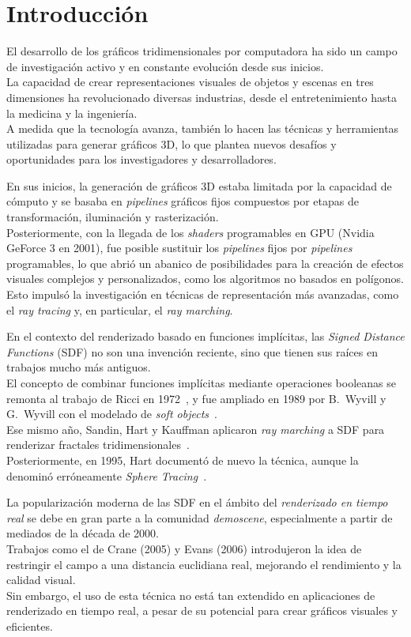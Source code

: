 \chapter{Introducción}
El desarrollo de los gráficos tridimensionales por computadora ha sido un campo de investigación activo y en constante evolución desde sus inicios.\\
La capacidad de crear representaciones visuales de objetos y escenas en tres dimensiones ha revolucionado diversas industrias, desde el entretenimiento hasta la medicina y la ingeniería.\\
A medida que la tecnología avanza, también lo hacen las técnicas y herramientas utilizadas para generar gráficos 3D, lo que plantea nuevos desafíos y oportunidades para los investigadores y desarrolladores.

En sus inicios, la generación de gráficos 3D estaba limitada por la capacidad de cómputo y se basaba en \textit{pipelines} gráficos fijos compuestos por etapas de transformación, iluminación y rasterización.\\
Posteriormente, con la llegada de los \textit{shaders} programables en GPU (Nvidia GeForce 3 en 2001), fue posible sustituir los \textit{pipelines} fijos por \textit{pipelines} programables, lo que abrió un abanico de posibilidades para la creación de efectos visuales complejos y personalizados, como los algoritmos no basados en polígonos.\\
Esto impulsó la investigación en técnicas de representación más avanzadas, como el \textit{ray tracing} y, en particular, el \textit{ray marching}.

En el contexto del renderizado basado en funciones implícitas, las \textit{Signed Distance Functions} (SDF) no son una invención reciente, sino que tienen sus raíces en trabajos mucho más antiguos.\\
El concepto de combinar funciones implícitas mediante operaciones booleanas se remonta al trabajo de Ricci en 1972~\cite{Ricci:1973:CGC}, y fue ampliado en 1989 por B.~Wyvill y G.~Wyvill con el modelado de \textit{soft objects}~\cite{wyvill1989}.\\
Ese mismo año, Sandin, Hart y Kauffman aplicaron \textit{ray marching} a SDF para renderizar fractales tridimensionales~\cite{hart1989ray}.\\
Posteriormente, en 1995, Hart documentó de nuevo la técnica, aunque la denominó erróneamente \textit{Sphere Tracing}~\cite{hart1996}.

La popularización moderna de las SDF en el ámbito del \textit{renderizado en tiempo real} se debe en gran parte a la comunidad \textit{demoscene}, especialmente a partir de mediados de la década de 2000.\\
Trabajos como el de Crane (2005) y Evans (2006) introdujeron la idea de restringir el campo a una distancia euclidiana real, mejorando el rendimiento y la calidad visual.\\
Sin embargo, el uso de esta técnica no está tan extendido en aplicaciones de renderizado en tiempo real, a pesar de su potencial para crear gráficos visuales y eficientes.
